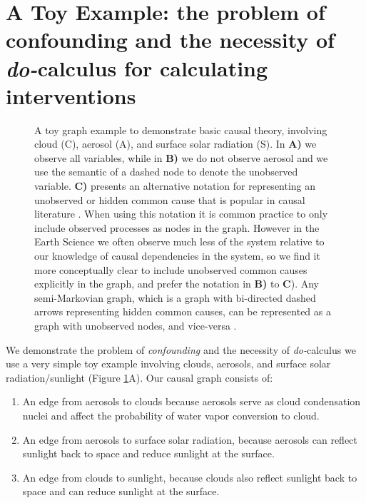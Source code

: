 \documentclass[12pt]{article}
\begin{document}
\section{A Toy Example: the problem of confounding and the necessity
  of \textit{do-}calculus for calculating interventions}
\label{sec:causal-graphs-pearls}

\begin{figure}
  \scalebox{1.0}{}
  \caption{A toy graph example to demonstrate basic causal theory,
    involving cloud (C), aerosol (A), and surface solar radiation
    (S). In \textbf{A)} we observe all variables, while in \textbf{B)}
    we do not observe aerosol and we use the semantic of a dashed node
    to denote the unobserved variable. \textbf{C)} presents an
    alternative notation for representing an unobserved or hidden
    common cause that is popular in causal literature \citep[e.g.,
    ``semi-Markovian graphs'',][]{shpitser2006}. When using this
    notation it is common practice to only include observed processes
    as nodes in the graph. However in the Earth Science we often
    observe much less of the system relative to our knowledge of
    causal dependencies in the system, so we find it more conceptually
    clear to include unobserved common causes explicitly in the graph,
    and prefer the notation in \textbf{B)} to \textbf{C}). Any
    semi-Markovian graph, which is a graph with bi-directed dashed
    arrows representing hidden common causes, can be represented as a
    graph with unobserved nodes, and vice-versa
    \citep[e.g.,][]{lee2019structural}.}
  \label{fig:toy}
\end{figure}

We demonstrate the problem of \textit{confounding} and the necessity of
\textit{do-}calculus we use a very simple toy example involving
clouds, aerosols, and surface solar radiation/sunlight (Figure
\ref{fig:toy}A). Our causal graph consists of:

\begin{enumerate}
\item An edge from aerosols to clouds because aerosols serve as cloud
  condensation nuclei and affect the probability of water vapor
  conversion to cloud.
\item An edge from aerosols to surface solar radiation, because
  aerosols can reflect sunlight back to space and reduce sunlight at
  the surface.
\item An edge from clouds to sunlight, because clouds also reflect
  sunlight back to space and can reduce sunlight at the surface.
\end{enumerate}
\end{document}
